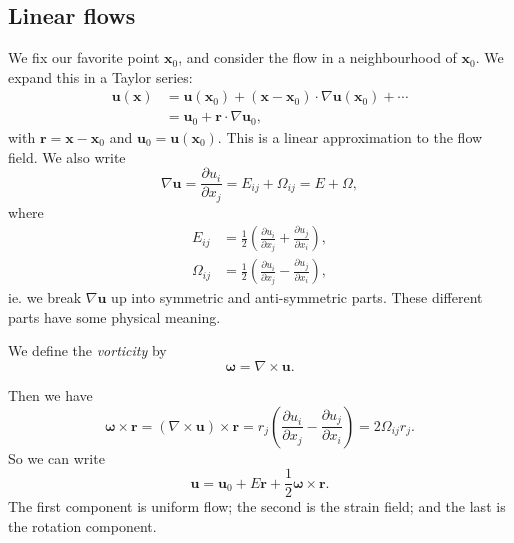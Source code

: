 \documentclass[a4paper]{article}
\begin{document}
\subsection{Linear flows}
We fix our favorite point $\mathbf{x}_0$, and consider the flow in a neighbourhood of $\mathbf{x}_0$. We expand this in a Taylor series:
\begin{align*}
  \mathbf{u}(\mathbf{x}) &= \mathbf{u}(\mathbf{x}_0) + (\mathbf{x} - \mathbf{x}_0) \cdot \nabla \mathbf{u}(\mathbf{x}_0) + \cdots\\
  &= \mathbf{u}_0 + \mathbf{r}\cdot \nabla \mathbf{u}_0,
\end{align*}
with $\mathbf{r} = \mathbf{x} - \mathbf{x}_0$ and $\mathbf{u}_0 = \mathbf{u}(\mathbf{x}_0)$. This is a linear approximation to the flow field. We also write
\[
  \nabla \mathbf{u} = \frac{\partial u_i}{\partial x_j} = E_{ij} + \Omega_{ij} = E + \Omega,
\]
where
\begin{align*}
  E_{ij} &= \frac{1}{2}\left(\frac{\partial u_i}{\partial x_j} + \frac{\partial u_j}{\partial x_i}\right),\\
  \Omega_{ij} &=\frac{1}{2}\left(\frac{\partial u_i}{\partial x_j} - \frac{\partial u_j}{\partial x_i}\right),
\end{align*}
ie. we break $\nabla \mathbf{u}$ up into symmetric and anti-symmetric parts. These different parts have some physical meaning.
\begin{defi}[Vorticity]
  We define the \emph{vorticity} by
  \[
    \boldsymbol\omega = \nabla \times \mathbf{u}.
  \]
\end{defi}
Then we have
\[
  \boldsymbol\omega \times \mathbf{r} = (\nabla \times \mathbf{u}) \times \mathbf{r} = r_j \left(\frac{\partial u_i}{\partial x_j} - \frac{\partial u_j}{\partial x_i}\right) = 2 \Omega_{ij}r_j.
\]
So we can write
\[
  \mathbf{u} = \mathbf{u}_0 + E \mathbf{r} + \frac{1}{2} \boldsymbol\omega \times \mathbf{r}.
\]
The first component is uniform flow; the second is the strain field; and the last is the rotation component.
\end{document}
